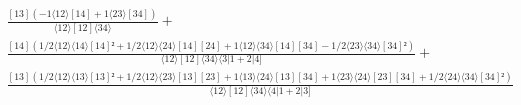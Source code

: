 \documentclass[varwidth, border=5pt]{standalone}
\begin{document}
\begin{my}
$\begin{gathered}
\scriptscriptstyle\frac{[13](-1⟨12⟩[14]+1⟨23⟩[34])}{⟨12⟩[12]⟨34⟩} +\\
\scriptscriptstyle\frac{[14](1/2⟨12⟩⟨14⟩[14]²+1/2⟨12⟩⟨24⟩[14][24]+1⟨12⟩⟨34⟩[14][34]-1/2⟨23⟩⟨34⟩[34]²)}{⟨12⟩[12]⟨34⟩⟨3|1+2|4]} +\\
\scriptscriptstyle\frac{[13](1/2⟨12⟩⟨13⟩[13]²+1/2⟨12⟩⟨23⟩[13][23]+1⟨13⟩⟨24⟩[13][34]+1⟨23⟩⟨24⟩[23][34]+1/2⟨24⟩⟨34⟩[34]²)}{⟨12⟩[12]⟨34⟩⟨4|1+2|3]} \phantom{+}
\end{gathered}$
\end{my}
\end{document}
